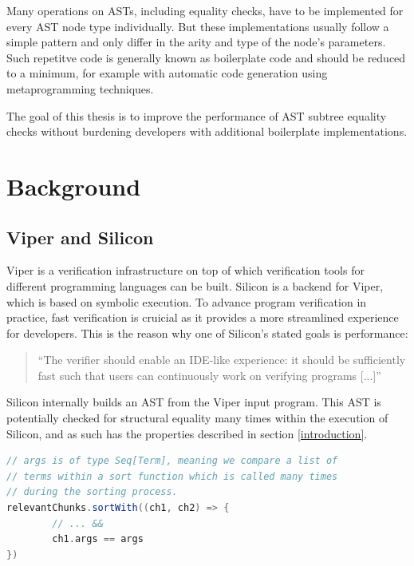 \documentclass[11pt]{article}
\begin{document}
    Many operations on ASTs, including equality checks, have to be implemented for
    every AST node type individually. But these implementations usually follow a simple
    pattern and only differ in the arity and type of the node's parameters. Such repetitve
    code is generally known as boilerplate code and should be reduced to a minimum, for example
    with automatic code generation using metaprogramming techniques.

    The goal of this thesis is to improve the performance of AST subtree equality checks
    without burdening developers with additional boilerplate implementations.
    
    \section{Background}

    \subsection{Viper and Silicon} \label{background:viper}
    
    Viper \cite{viper} is a verification infrastructure on top of which verification tools
    for different programming languages can be built. Silicon \cite{silicon} is a backend for Viper,
    which is based on symbolic execution. To advance program verification in practice,
    fast verification is cruicial as it provides a more streamlined experience for developers.
    This is the reason why one of Silicon's stated goals is performance:

    \begin{quote} 
        ``The verifier should enable an IDE-like experience: it should be
        sufficiently fast such that users can continuously work on verifying
        programs [...]'' \cite{silicon}
    \end{quote}

    Silicon internally builds an AST from the Viper input
    program. This AST is potentially checked for structural equality many times within
    the execution of Silicon, and as such has the properties described in section \ref{introduction}.

    \begin{lstlisting}[language=Scala, caption=Example of multiple subtree (``term'') equality checks occuring during the execution of Silicon.]
// args is of type Seq[Term], meaning we compare a list of
// terms within a sort function which is called many times
// during the sorting process.
relevantChunks.sortWith((ch1, ch2) => {
        // ... &&
        ch1.args == args
})
    \end{lstlisting}
\end{document}
